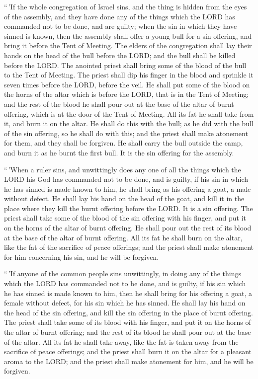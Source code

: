  ``\,'If the whole congregation of Israel sins, and the
thing is hidden from the eyes of the assembly, and they have done any of
the things which the LORD has commanded not to be done, and are guilty;
 when the sin in which they have sinned is known, then the
assembly shall offer a young bull for a sin offering, and bring it
before the Tent of Meeting.  The elders of the congregation
shall lay their hands on the head of the bull before the LORD; and the
bull shall be killed before the LORD.  The anointed priest
shall bring some of the blood of the bull to the Tent of Meeting.
 The priest shall dip his finger in the blood and sprinkle
it seven times before the LORD, before the veil.  He shall
put some of the blood on the horns of the altar which is before the
LORD, that is in the Tent of Meeting; and the rest of the blood he shall
pour out at the base of the altar of burnt offering, which is at the
door of the Tent of Meeting.  All its fat he shall take
from it, and burn it on the altar.  He shall do this with
the bull; as he did with the bull of the sin offering, so he shall do
with this; and the priest shall make atonement for them, and they shall
be forgiven.  He shall carry the bull outside the camp, and
burn it as he burnt the first bull. It is the sin offering for the
assembly.

 ``\,'When a ruler sins, and unwittingly does any one of
all the things which the LORD his God has commanded not to be done, and
is guilty,  if his sin in which he has sinned is made known
to him, he shall bring as his offering a goat, a male without defect.
 He shall lay his hand on the head of the goat, and kill it
in the place where they kill the burnt offering before the LORD. It is a
sin offering.  The priest shall take some of the blood of
the sin offering with his finger, and put it on the horns of the altar
of burnt offering. He shall pour out the rest of its blood at the base
of the altar of burnt offering.  All its fat he shall burn
on the altar, like the fat of the sacrifice of peace offerings; and the
priest shall make atonement for him concerning his sin, and he will be
forgiven.

 ``\,'If anyone of the common people sins unwittingly, in
doing any of the things which the LORD has commanded not to be done, and
is guilty,  if his sin which he has sinned is made known to
him, then he shall bring for his offering a goat, a female without
defect, for his sin which he has sinned.  He shall lay his
hand on the head of the sin offering, and kill the sin offering in the
place of burnt offering.  The priest shall take some of its
blood with his finger, and put it on the horns of the altar of burnt
offering; and the rest of its blood he shall pour out at the base of the
altar.  All its fat he shall take away, like the fat is
taken away from the sacrifice of peace offerings; and the priest shall
burn it on the altar for a pleasant aroma to the LORD; and the priest
shall make atonement for him, and he will be forgiven.

